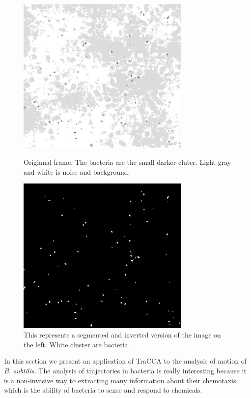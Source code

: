 \documentclass[conference]{IEEEtran}
\begin{document}
\begin{figure}
    \begin{minipage}[l]{1.0\columnwidth}
        \centering
        \includegraphics[width=8.5cm]{./images/bacteriasmall}
        \caption{Origianal frame. The bacteria are the small darker cluter. Light gray and white is noise and background.}\label{contrast}
    \end{minipage}
    \hfill{}
    \begin{minipage}[r]{1.0\columnwidth}
        \centering
        \includegraphics[width=8.5cm]{./images/bacteriasmall_threshold}
        \caption{This represents a segmented and inverted version of the image on the left. White cluster are bacteria.}\label{BBB}
    \end{minipage}
\end{figure}
In this section we present an application of TraCCA to the analysis of motion of \textit{B. subtilis.}
The analysis of trajectories in bacteria is really interesting because it is a non-invasive way to extracting many information about their chemotaxis which is the ability of bacteria to sense and respond to chemicals.
\end{document}
